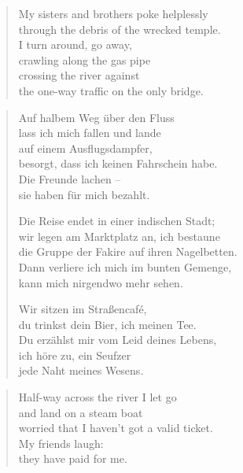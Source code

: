 {\begin{verse}
\rhytmbreak

My sisters and brothers poke helplessly\\
through the debris of the wrecked temple.\\
I turn around, go away,\\
crawling along the gas pipe\\
crossing the river against\\
the one-way traffic on the only bridge.

\rhytmbreak

\end{verse}

\clearpage

\begin{verse}

Auf halbem Weg über den Fluss\\
lass ich mich fallen und lande\\
auf einem Ausflugsdampfer,\\
besorgt, dass ich keinen Fahrschein habe.\\
Die Freunde lachen --\\
sie haben für mich bezahlt.

\rhytmbreak

Die Reise endet in einer indischen Stadt;\\
wir legen am Marktplatz an, ich bestaune\\
die Gruppe der Fakire auf ihren Nagelbetten.\\
Dann verliere ich mich im bunten Gemenge,\\
kann mich nirgendwo mehr sehen.

\rhytmbreak

Wir sitzen im Straßencafé,\\
du trinkst dein Bier, ich meinen Tee.\\
Du erzählst mir vom Leid deines Lebens,\\
ich höre zu, ein Seufzer\\
jede Naht meines Wesens.

\rhytmbreak

\end{verse}

\clearpage

\begin{verse}
Half-way across the river I let go\\
and land on a steam boat\\
worried that I haven't got a valid ticket.\\
My friends laugh:\\
they have paid for me.


\end{verse}}
